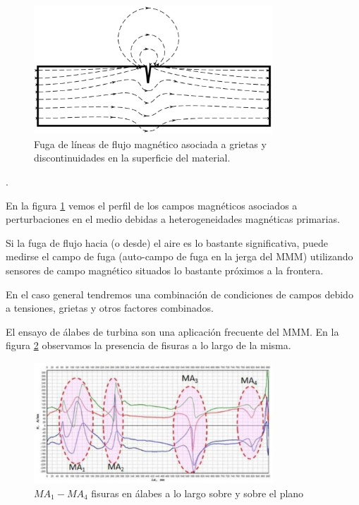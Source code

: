 \begin{figure}[h]
	\centering
	\includegraphics[width=0.8\textwidth]{./Figures/fig51}
	\caption{Fuga de líneas de flujo magnético asociada a grietas y discontinuidades en la superficie del material.}
	\label{fig:51}
\end{figure}. 

En la figura \ref{fig:51} vemos el perfil de los campos magnéticos asociados a perturbaciones en el medio debidas a heterogeneidades magnéticas primarias.

Si la fuga de flujo hacia (o desde) el aire es lo bastante significativa, puede medirse el campo de fuga (auto-campo de fuga en la jerga del MMM) utilizando sensores de campo magnético situados lo bastante próximos a la frontera.


En el caso general tendremos una combinación de condiciones de campos debido a tensiones, grietas y otros factores combinados.


El ensayo de álabes de turbina son una aplicación frecuente del MMM. En la figura \ref{fig:52} observamos la presencia de fisuras a lo largo de la misma.

\begin{figure}[H]
    \centering
    \includegraphics[width=0.8\textwidth]{./Figures/fig52}
	\caption{$MA_{1}-MA_{4}$ fisuras en álabes a lo largo sobre y sobre el plano}
	\label{fig:52}
\end{figure}

